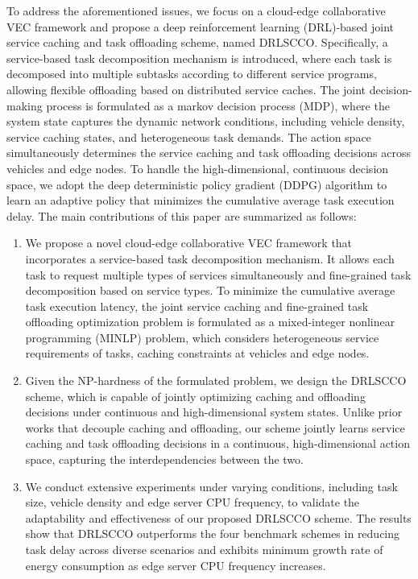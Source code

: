 \documentclass[lettersize,journal]{IEEEtran}
\begin{document}
To address the aforementioned issues, we focus on a cloud-edge collaborative VEC framework
and propose a deep reinforcement learning (DRL)-based joint service caching and task offloading scheme, named DRLSCCO. 
Specifically, a service-based task decomposition mechanism is introduced, where each task is decomposed into multiple subtasks according to different service programs, allowing flexible offloading based on distributed service caches. 
The joint decision-making process is formulated as a markov decision process (MDP), where the system state captures the dynamic network conditions, including vehicle density, service caching states, and heterogeneous task demands. The action space simultaneously determines the service caching and task offloading decisions across vehicles and edge nodes.
To handle the high-dimensional, continuous decision space, we adopt the deep deterministic policy gradient (DDPG) algorithm to learn an adaptive policy that minimizes the cumulative average task execution delay.
The main contributions of this paper are summarized as follows: 
\begin{enumerate}
	\item 
	We propose a novel cloud-edge collaborative VEC framework that incorporates a service-based task decomposition mechanism. It allows each task to request multiple types of services simultaneously and  fine-grained task decomposition based on service types.
	To minimize the cumulative average task execution latency, the joint service caching and fine-grained task offloading optimization problem is formulated as a mixed-integer nonlinear programming (MINLP) problem, which considers heterogeneous service requirements of tasks, caching constraints at vehicles and edge nodes.

	\item 
	Given the NP-hardness of the formulated problem, we design the DRLSCCO scheme, which is capable of jointly optimizing caching and offloading decisions under continuous and high-dimensional system states. Unlike prior works that decouple caching and offloading, our scheme jointly learns service caching and task offloading decisions in a continuous, high-dimensional action space, capturing the interdependencies between the two.
	
	\item We conduct extensive experiments under varying conditions, including task size, vehicle density and edge server CPU frequency, to validate the adaptability and effectiveness of our proposed DRLSCCO scheme. The results show that DRLSCCO outperforms the four benchmark schemes in reducing task delay across diverse scenarios and
	exhibits minimum growth rate of energy consumption as edge server CPU frequency increases.
\end{enumerate}
\end{document}
